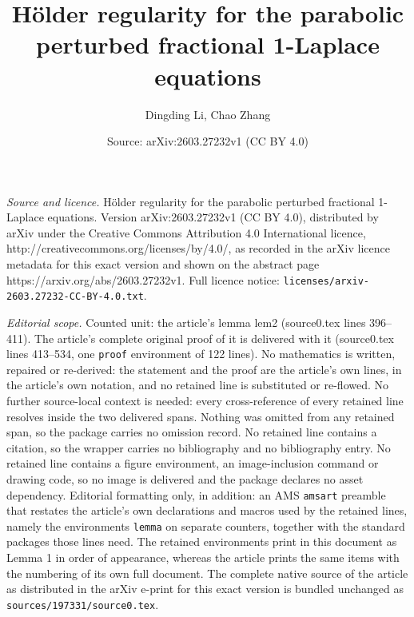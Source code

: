 \documentclass[10pt,a4paper]{amsart}
\title{H\"{o}lder regularity for the parabolic perturbed fractional 1-Laplace equations}
\author{Dingding Li, Chao Zhang}
\date{Source: arXiv:2603.27232v1 (CC BY 4.0)}
\begin{document}
\maketitle

\noindent\emph{Source and licence.} H\"{o}lder regularity for the parabolic perturbed fractional 1-Laplace equations. Version arXiv:2603.27232v1 (CC BY 4.0), distributed by arXiv under the Creative Commons Attribution 4.0 International licence, http://creativecommons.org/licenses/by/4.0/, as recorded in the arXiv licence metadata for this exact version and shown on the abstract page https://arxiv.org/abs/2603.27232v1. Full licence notice: \texttt{licenses/arxiv-2603.27232-CC-BY-4.0.txt}.\par\smallskip

\noindent\textit{Editorial scope.} Counted unit: the article's lemma lem2 (source0.tex lines 396--411). The article's complete original proof of it is delivered with it (source0.tex lines 413--534, one \texttt{proof} environment of 122 lines). No mathematics is written, repaired or re-derived: the statement and the proof are the article's own lines, in the article's own notation, and no retained line is substituted or re-flowed.  No further source-local context is needed: every cross-reference of every retained line resolves inside the two delivered spans.  Nothing was omitted from any retained span, so the package carries no omission record.  No retained line contains a citation, so the wrapper carries no bibliography and no bibliography entry.  No retained line contains a figure environment, an image-inclusion command or drawing code, so no image is delivered and the package declares no asset dependency.  Editorial formatting only, in addition: an AMS \texttt{amsart} preamble that restates the article's own declarations and macros used by the retained lines, namely the environments \texttt{lemma} on separate counters, together with the standard packages those lines need.  The retained environments print in this document as Lemma 1 in order of appearance, whereas the article prints the same items with the numbering of its own full document.  The complete native source of the article as distributed in the arXiv e-print for this exact version is bundled unchanged as \texttt{sources/197331/source0.tex}.
\end{document}
